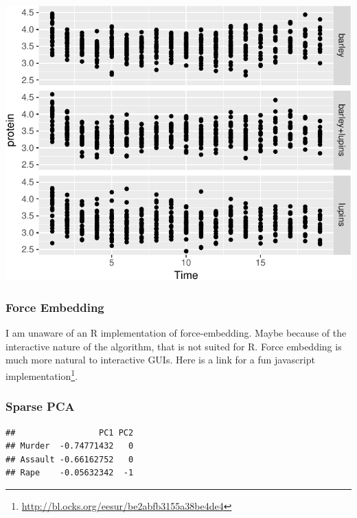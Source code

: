 \documentclass[]{book}
\newenvironment{Shaded}{\begin{snugshade}}{\end{snugshade}}
\newcommand{\CommentTok}[1]{\textcolor[rgb]{0.56,0.35,0.01}{\textit{#1}}}
\newcommand{\DataTypeTok}[1]{\textcolor[rgb]{0.13,0.29,0.53}{#1}}
\newcommand{\DecValTok}[1]{\textcolor[rgb]{0.00,0.00,0.81}{#1}}
\newcommand{\FloatTok}[1]{\textcolor[rgb]{0.00,0.00,0.81}{#1}}
\newcommand{\KeywordTok}[1]{\textcolor[rgb]{0.13,0.29,0.53}{\textbf{#1}}}
\newcommand{\NormalTok}[1]{#1}
\newcommand{\OperatorTok}[1]{\textcolor[rgb]{0.81,0.36,0.00}{\textbf{#1}}}
\newcommand{\OtherTok}[1]{\textcolor[rgb]{0.56,0.35,0.01}{#1}}
\newcommand{\StringTok}[1]{\textcolor[rgb]{0.31,0.60,0.02}{#1}}
\renewcommand{\href}[2]{#2\footnote{\url{#1}}}
\theoremstyle{definition}
\theoremstyle{definition}
\theoremstyle{definition}
\theoremstyle{remark}
\begin{document}
\includegraphics[width=0.5\linewidth]{Rcourse_files/figure-latex/unnamed-chunk-246-1}

\hypertarget{force-embedding}{%
\subsubsection{Force Embedding}\label{force-embedding}}

I am unaware of an R implementation of force-embedding.
Maybe because of the interactive nature of the algorithm, that is not suited for R.
Force embedding is much more natural to interactive GUIs.
Here is a link for a fun \href{http://bl.ocks.org/eesur/be2abfb3155a38be4de4}{javascript implementation}.

\hypertarget{sparse-pca}{%
\subsubsection{Sparse PCA}\label{sparse-pca}}

\begin{Shaded}
\end{Shaded}

\begin{verbatim}
##                 PC1 PC2
## Murder  -0.74771432   0
## Assault -0.66162752   0
## Rape    -0.05632342  -1
\end{verbatim}
\end{document}
